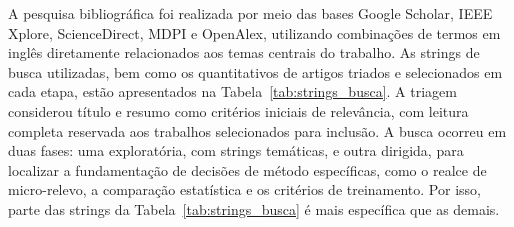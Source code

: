 \documentclass[
    12pt,                %
    openright,           %
    oneside,             %
    a4paper,             %
    english,             %
    brazil               %
]{abntex2}
\begin{document}
A pesquisa bibliográfica foi realizada por meio das bases Google Scholar,
IEEE Xplore, ScienceDirect, MDPI e OpenAlex, utilizando combinações de termos em 
inglês diretamente relacionados aos temas centrais do trabalho. As 
strings de busca utilizadas, bem como os quantitativos de artigos 
triados e selecionados em cada etapa, estão apresentados na 
Tabela~\ref{tab:strings_busca}. A triagem considerou título e resumo 
como critérios iniciais de relevância, com leitura completa reservada
aos trabalhos selecionados para inclusão. A busca ocorreu em duas fases:
uma exploratória, com strings temáticas, e outra dirigida, para
localizar a fundamentação de decisões de método específicas, como o
realce de micro-relevo, a comparação estatística e os critérios de
treinamento. Por isso, parte das strings da
Tabela~\ref{tab:strings_busca} é mais específica que as demais.
\end{document}
